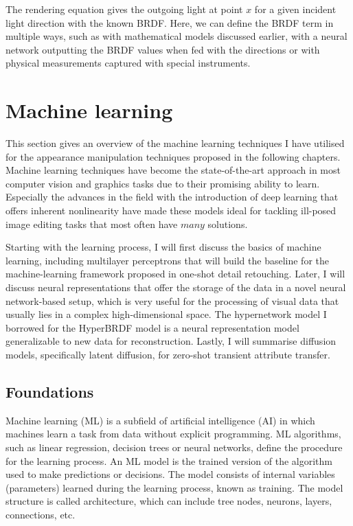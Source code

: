 The rendering equation gives the outgoing light at point $x$ for a given incident light direction with the known BRDF. Here, we can define the BRDF term in multiple ways, such as with mathematical models discussed earlier, with a neural network outputting the BRDF values when fed with the directions or with physical measurements captured with special instruments. 

\section{Machine learning}
This section gives an overview of the machine learning techniques I have utilised for the appearance manipulation techniques proposed in the following chapters. Machine learning techniques have become the state-of-the-art approach in most computer vision and graphics tasks due to their promising ability to learn. Especially the advances in the field with the introduction of deep learning that offers inherent nonlinearity have made these models ideal for tackling ill-posed image editing tasks that most often have $many$ solutions.

Starting with the learning process, I will first discuss the basics of machine learning, including multilayer perceptrons that will build the baseline for the machine-learning framework proposed in one-shot detail retouching. Later, I will discuss neural representations that offer the storage of the data in a novel neural network-based setup, which is very useful for the processing of visual data that usually lies in a complex high-dimensional space. The hypernetwork model I borrowed for the HyperBRDF model is a neural representation model generalizable to new data for reconstruction. Lastly, I will summarise diffusion models, specifically latent diffusion, for zero-shot transient attribute transfer.

\subsection{Foundations}
Machine learning (ML) is a subfield of artificial intelligence (AI) in which machines learn a task from data without explicit programming. ML algorithms, such as linear regression, decision trees or neural networks, define the procedure for the learning process. An ML model is the trained version of the algorithm used to make predictions or decisions. The model consists of internal variables (parameters) learned during the learning process, known as training. The model structure is called architecture, which can include tree nodes, neurons, layers, connections, etc.

